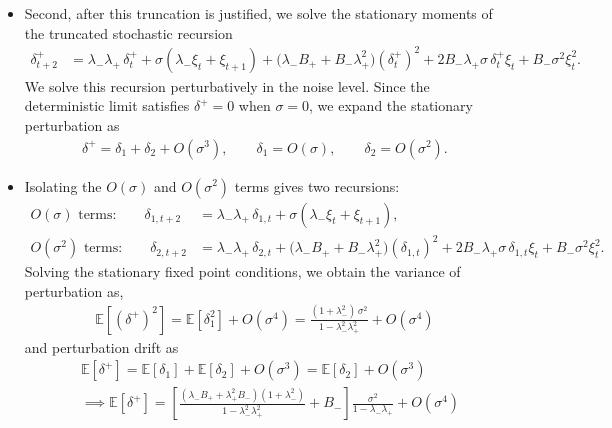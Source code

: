 \documentclass{article} %
\theoremstyle{plain}
\theoremstyle{definition}
\begin{document}
\begin{itemize}[nosep,leftmargin=*]
    \item Second, after this truncation is justified, we solve the stationary
    moments of the truncated stochastic recursion
    \begin{align}
    \label{trunc-stoch-recursion}
    \delta_{t+2}^+
    &=
    \lambda_-\lambda_+\,\delta_t^+
    +\sigma(\lambda_-\xi_t+\xi_{t+1})
    +\bigl(\lambda_-B_+ + B_-\lambda_+^2\bigr)(\delta_t^+)^2 
    +2B_-\lambda_+\sigma\,\delta_t^+\xi_t
    +B_-\sigma^2\xi_t^2 .
    \end{align}
We solve this recursion perturbatively in the noise level. Since the
deterministic limit satisfies \(\delta^+=0\) when \(\sigma=0\), we expand the
stationary perturbation as
\begin{align}
    \delta^+ = \delta_1+\delta_2+O(\sigma^3),
    \qquad
    \delta_1=O(\sigma),
    \qquad
    \delta_2=O(\sigma^2).
\end{align} 
\item Isolating the \(O(\sigma)\) and \(O(\sigma^2)\) terms gives two
recursions:
\begin{align}
\text{\(O(\sigma)\) terms:}\qquad
\delta_{1,t+2}
&=
\lambda_-\lambda_+\,\delta_{1,t}
+\sigma(\lambda_-\xi_t+\xi_{t+1}),
\label{eq:first-order-delta}
\\
\text{\(O(\sigma^2)\) terms:}\qquad
\delta_{2,t+2}
&=
\lambda_-\lambda_+\,\delta_{2,t}
+\bigl(\lambda_-B_+ + B_-\lambda_+^2\bigr)(\delta_{1,t})^2
+2B_-\lambda_+\sigma\,\delta_{1,t}\xi_t
+B_-\sigma^2\xi_t^2 .
\label{eq:second-order-delta}
\end{align}
Solving the stationary fixed point conditions, we obtain the variance of perturbation as, 
\begin{align}
    \mathbb{E}[ (\delta^+)^2 ] = \mathbb{E}[\delta^{2}_1] +O(\sigma^4) = \frac{(1+\lambda_-^2)\,\sigma^2}{1-\lambda^2_-\lambda_+^2}+O(\sigma^4)
\end{align}
and perturbation drift as 
\begin{align}
  &  \mathbb{E}[ \delta^+ ] = \mathbb{E}[\delta_1] + \mathbb{E}[\delta_2] +O(\sigma^3) = \mathbb{E}[\delta_2] +O(\sigma^3) \\
  & \implies \mathbb{E}[ \delta^+ ] =\left[\frac{(\lambda_-B_++\lambda_+^2B_-)(1+\lambda_-^2)}{1-\lambda^2_-\lambda_+^2}
+B_-\right]\frac{\sigma^2}{1-\lambda_-\lambda_+}+O(\sigma^4)
\end{align}
 




\end{itemize}
\end{document}
